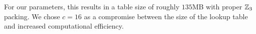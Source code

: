 For our parameters, this results in a table size of roughly $135$MB with proper $\mathbb{Z}_3$ packing. We chose $c = 16$ as a compromise between the size of the lookup table and increased computational efficiency.


\fi















